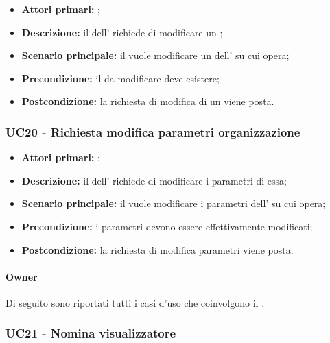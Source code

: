 \documentclass[../analisi-dei-requisiti]{subfiles}
\begin{document}
\begin{itemize}
  \item \textbf{Attori primari:} ;
  \item \textbf{Descrizione:} il  dell' richiede di modificare un ;
  \item \textbf{Scenario principale:} il  vuole modificare un  dell' su cui opera;
  \item \textbf{Precondizione:} il  da modificare deve esistere;
  \item \textbf{Postcondizione:} la richiesta di modifica di un  viene posta.

\end{itemize}


\subsubsection{UC20 - Richiesta modifica parametri organizzazione}
\label{subsub:UC20}

\begin{itemize}
  \item \textbf{Attori primari:} ;
  \item \textbf{Descrizione:} il  dell' richiede di modificare i parametri di essa;
  \item \textbf{Scenario principale:} il  vuole modificare i parametri dell' su cui opera;
  \item \textbf{Precondizione:} i parametri devono essere effettivamente modificati;
  \item \textbf{Postcondizione:} la richiesta di modifica parametri viene posta.

\end{itemize}

\paragraph{Owner}
Di seguito sono riportati tutti i casi d'uso che coinvolgono il  .

\subsubsection{UC21 - Nomina visualizzatore}
\label{subsub:UC21}
\end{document}
